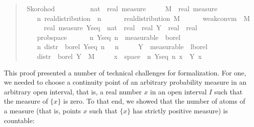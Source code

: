 \documentclass{svjour3}
\begin{document}
\begin{quote}
\begin{isabellebody}
\isamarkupfalse%
\ Skorohod{\isacharcolon}\isanewline
\ \ \ \isanewline
\ \ \ \ {\isasymmu}\ {\isacharcolon}{\isacharcolon}\ {\isachardoublequoteopen}nat\ {\isasymRightarrow}\ real\ measure{\isachardoublequoteclose}\ \isanewline
\ \ \ \ M\ {\isacharcolon}{\isacharcolon}\ {\isachardoublequoteopen}real\ measure{\isachardoublequoteclose}\isanewline
\ \ \ \isanewline
\ \ \ \ {\isachardoublequoteopen}{\isasymAnd}n{\isachardot}\ real{\isacharunderscore}distribution\ {\isacharparenleft}{\isasymmu}\ n{\isacharparenright}{\isachardoublequoteclose}\ \ \isanewline
\ \ \ \ {\isachardoublequoteopen}real{\isacharunderscore}distribution\ M{\isachardoublequoteclose}\ \ \isanewline
\ \ \ \ {\isachardoublequoteopen}weak{\isacharunderscore}conv{\isacharunderscore}m\ {\isasymmu}\ M{\isachardoublequoteclose}\isanewline
\ \ \ {\isachardoublequoteopen}{\isasymexists}\ {\isacharparenleft}{\isasymOmega}\ {\isacharcolon}{\isacharcolon}\ real\ measure{\isacharparenright}\ {\isacharparenleft}Y{\isacharunderscore}seq\ {\isacharcolon}{\isacharcolon}\ nat\ {\isasymRightarrow}\ real\ {\isasymRightarrow}\ real{\isacharparenright}\ {\isacharparenleft}Y\ {\isacharcolon}{\isacharcolon}\ real\ {\isasymRightarrow}\ real{\isacharparenright}{\isachardot}\ \isanewline
\ \ \ \ prob{\isacharunderscore}space\ {\isasymOmega}\ {\isasymand}\isanewline
\ \ \ \ {\isacharparenleft}{\isasymforall}n{\isachardot}\ Y{\isacharunderscore}seq\ n\ {\isasymin}\ measurable\ {\isasymOmega}\ borel{\isacharparenright}\ {\isasymand}\isanewline
\ \ \ \ {\isacharparenleft}{\isasymforall}n{\isachardot}\ distr\ {\isasymOmega}\ borel\ {\isacharparenleft}Y{\isacharunderscore}seq\ n{\isacharparenright}\ {\isacharequal}\ {\isasymmu}\ n{\isacharparenright}\ {\isasymand}\isanewline
\ \ \ \ Y\ {\isasymin}\ measurable\ {\isasymOmega}\ lborel\ {\isasymand}\isanewline
\ \ \ \ distr\ {\isasymOmega}\ borel\ Y\ {\isacharequal}\ M\ {\isasymand}\isanewline
\ \ \ \ {\isacharparenleft}{\isasymforall}x\ {\isasymin}\ space\ {\isasymOmega}{\isachardot}\ {\isacharparenleft}{\isasymlambda}n{\isachardot}\ Y{\isacharunderscore}seq\ n\ x{\isacharparenright}\ {\isacharminus}{\isacharminus}{\isacharminus}{\isacharminus}{\isachargreater}\ Y\ x{\isacharparenright}{\isachardoublequoteclose}
\end{isabellebody}
\end{quote}
This proof presented a number of technical challenges for formalization. For one, we needed to choose a continuity point of an arbitrary probability measure in an arbitrary open interval, that is, a real number $x$ in an open interval $I$ such that the measure of $\{x\}$ is zero. To that end, we showed that the number of atoms of a measure (that is, points $x$ such that $\{x\}$ has strictly positive measure) is countable:
\end{document}
